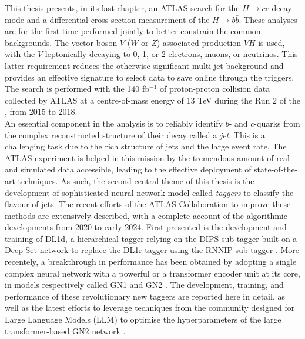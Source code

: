 This thesis presents, in its last chapter, an ATLAS search for the $H \rightarrow c\bar{c}$ decay mode and a differential cross-section measurement of the $H \rightarrow b\bar{b}$. These analyses are for the first time performed jointly to better constrain the common backgrounds. The vector boson $V$ ($W$ or $Z$) associated production $VH$ is used, with the $V$ leptonically decaying to 0, 1, or 2 electrons, muons, or neutrinos. This latter requirement reduces the otherwise significant multi-jet background and provides an effective signature to select data to save online through the triggers. The search is performed with the 140 fb$^{-1}$ of proton-proton collision data collected by ATLAS at a centre-of-mass energy of 13 TeV during the Run 2 of the , from 2015 to 2018. \\

An essential component in the analysis is to reliably identify $b$- and $c$-quarks from the complex reconstructed structure of their decay called a \textit{jet}. This is a challenging task due to the rich structure of jets and the large event rate. The ATLAS experiment is helped in this mission by the tremendous amount of real and simulated data accessible, leading to the effective deployment of state-of-the-art  techniques. As such, the second central theme of this thesis is the development of sophisticated neural network model called \textit{taggers} to classify the flavour of jets. The recent efforts of the ATLAS Collaboration to improve these methods are extensively described, with a complete account of the algorithmic developments from 2020 to early 2024. First presented is the development and training of DL1d, a hierarchical tagger relying on the DIPS sub-tagger built on a Deep Set network to replace the DL1r tagger using the RNNIP sub-tagger \cite{ATL-PLOT-FTAG-2023-01}. More recentely, a breakthrough in performance has been obtained by adopting a single complex neural network with a powerful  or a transformer encoder unit at its core, in models respectively called GN1 \cite{ATL-PHYS-PUB-2022-027} and GN2 \cite{duperrin2023flavour}. The development, training, and performance of these revolutionary new taggers are reported here in detail, as well as the latest efforts to leverage techniques from the  community designed for Large Language Models (LLM) to optimise the hyperparameters of the large transformer-based GN2 network \cite{yang2021tuning, publicplotMUP}. \\

